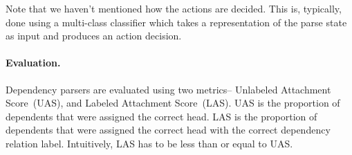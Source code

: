 Note that we haven't mentioned how the actions are decided. This is, typically, done using a multi-class classifier which takes a representation of the parse state as input and produces an action decision.

\paragraph{Evaluation.} Dependency parsers are evaluated using two metrics-- Unlabeled Attachment Score~(UAS), and Labeled Attachment Score~(LAS). UAS is the proportion of dependents that were assigned the correct head. LAS is the proportion of dependents that were assigned the correct head with the correct dependency relation label. Intuitively, LAS has to be less than or equal to UAS. 